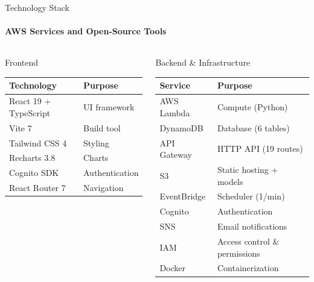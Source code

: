 \documentclass[aspectratio=169,11pt]{beamer}
\begin{document}
{

\begin{frame}[t]{Technology Stack}
\framesubtitle{AWS Services and Open-Source Tools}
\vspace{-0.5em}
\setlength{\tabcolsep}{3pt}
\renewcommand{\arraystretch}{0.9}

\vspace{-0.8em}

\begin{columns}[T,onlytextwidth]
\begin{block}{Frontend}
\vspace{0em}
\centering
\begin{tabular}{ll}
\toprule
\textbf{Technology} & \textbf{Purpose} \\
\midrule
React 19 + TypeScript & UI framework \\
Vite 7 & Build tool \\
Tailwind CSS 4 & Styling \\
Recharts 3.8 & Charts \\
Cognito SDK & Authentication \\
React Router 7 & Navigation \\
\bottomrule
\end{tabular}
\vspace{0em}
\end{block}

\begin{block}{Backend \& Infrastructure}
\vspace{-0.2em}
\centering
\begin{tabular}{ll}
\toprule
\textbf{Service} & \textbf{Purpose} \\
\midrule
AWS Lambda & Compute (Python) \\
DynamoDB & Database (6 tables) \\
API Gateway & HTTP API (19 routes) \\
S3 & Static hosting + models \\
EventBridge & Scheduler (1/min) \\
Cognito & Authentication \\
SNS & Email notifications \\
IAM & Access control \& permissions \\
Docker & Containerization \\
\bottomrule
\end{tabular}
\vspace{-0.2em}
\end{block}
\end{columns}


\end{frame}}
\end{document}
